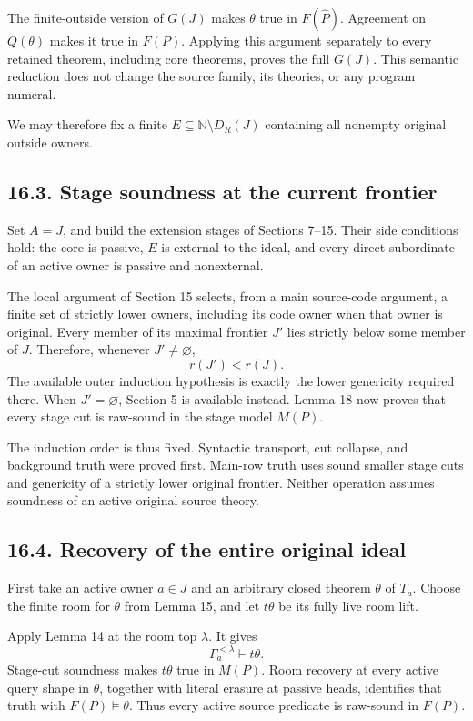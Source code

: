 \documentclass[
  11pt,
  letterpaper,
]{article}
\begin{document}
The finite-outside version of \(G(J)\) makes \(\theta\) true in
\(F(\widehat P)\). Agreement on \(Q(\theta)\) makes it true in \(F(P)\).
Applying this argument separately to every retained theorem, including
core theorems, proves the full \(G(J)\). This semantic reduction does
not change the source family, its theories, or any program numeral.

We may therefore fix a finite \(E\subseteq\mathbb N\setminus D_R(J)\)
containing all nonempty original outside owners.

\subsection{16.3. Stage soundness at the current
frontier}\label{stage-soundness-at-the-current-frontier}

Set \(A=J\), and build the extension stages of Sections 7--15. Their
side conditions hold: the core is passive, \(E\) is external to the
ideal, and every direct subordinate of an active owner is passive and
nonexternal.

The local argument of Section 15 selects, from a main source-code
argument, a finite set of strictly lower owners, including its code
owner when that owner is original. Every member of its maximal frontier
\(J'\) lies strictly below some member of \(J\). Therefore, whenever
\(J'\ne\varnothing\), \[
r(J')<r(J).
\] The available outer induction hypothesis is exactly the lower
genericity required there. When \(J'=\varnothing\), Section 5 is
available instead. Lemma 18 now proves that every stage cut is raw-sound
in the stage model \(M(P)\).

The induction order is thus fixed. Syntactic transport, cut collapse,
and background truth were proved first. Main-row truth uses sound
smaller stage cuts and genericity of a strictly lower original frontier.
Neither operation assumes soundness of an active original source theory.

\subsection{16.4. Recovery of the entire original
ideal}\label{recovery-of-the-entire-original-ideal}

First take an active owner \(a\in J\) and an arbitrary closed theorem
\(\theta\) of \(T_a\). Choose the finite room for \(\theta\) from Lemma
15, and let \(t\theta\) be its fully live room lift.

Apply Lemma 14 at the room top \(\lambda\). It gives \[
\Gamma_a^{<\lambda}\vdash t\theta.
\] Stage-cut soundness makes \(t\theta\) true in \(M(P)\). Room recovery
at every active query shape in \(\theta\), together with literal erasure
at passive heads, identifies that truth with \(F(P)\models\theta\). Thus
every active source predicate is raw-sound in \(F(P)\).
\end{document}
